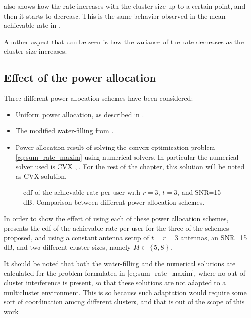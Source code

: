 also shows how the rate increases with the cluster
size up to a certain point, and then it starts to decrease. This is the same
behavior observed in the mean achievable rate in .

Another aspect that can be seen is how the variance of the rate decreases as the
cluster size increases.

\subsection{Effect of the power allocation}\label{ssec:stats_power_alloc}

Three different power allocation schemes have been considered:

\begin{itemize}
   \item Uniform power allocation, as described in
      .
   \item The modified water-filling from .
   \item Power allocation result of solving the convex optimization
      problem \eqref{eq:sum_rate_maxim} using numerical solvers. In particular
      the numerical solver used is CVX \cite{cvx}, \cite{gb08}. For the rest of
      the chapter, this solution will be noted as CVX solution.
\end{itemize}

\begin{figure}[t]
\begin{center}
    
    \restoregeometry
\end{center}
\caption{\gls{cdf} of the achievable rate per user with $r=3$, $t=3$, and SNR=15\,dB.
Comparison between different power allocation schemes.}
\label{fig:cdf_power_alloc}
\end{figure}

In order to show the effect of using each of these power allocation schemes,
 presents the \gls{cdf} of the achievable rate per
user for the three of the schemes proposed, and using a constant antenna setup
of $t = r = 3$ antennas, an SNR=15\,dB, and two different cluster sizes, namely
$M \in \left\{5, 8\right\}$.

It should be noted that both the water-filling and the numerical solutions are
calculated for the problem formulated in \eqref{eq:sum_rate_maxim}, where no
out-of-cluster interference is present, so that these solutions are not adapted
to a multicluster environment. This is so because such adaptation would require
some sort of coordination among different clusters, and that is out of the scope
of this work.

